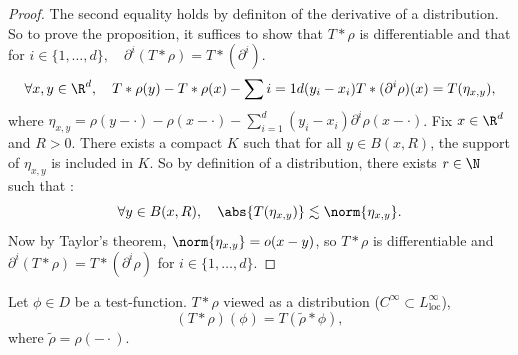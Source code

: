\begin{proof}
    The second equality holds by definiton of the derivative of a distribution. So to prove the proposition, 
    it suffices to show that $T*\rho$ is differentiable and that for $i \in \{1,\dots,d\}, \quad \partial^{i}(T*\rho) = T*(\partial^{i}).$
    \begin{equation*}
        \forall x,y \in \R^d, \quad T*\rho(y) - T*\rho(x) - \sum{i=1}{d} (y_i - x_i) T*(\partial^{i}\rho)(x) = T(\eta_{x,y}),
    \end{equation*}
    where $\eta_{x,y} = \rho(y - \cdot) - \rho(x- \cdot) - \sum_{i=1}^{d}(y_i - x_i)\partial^{i}\rho(x- \cdot)$.
    Fix $x\in \R^d$ and $R>0$. There exists a compact $K$ such that for all $y\in B(x,R)$, the support of $\eta_{x,y}$ is included in $K$.
    So by definition of a distribution, there exists $r\in \N$ such that :
    $$\forall y \in B(x,R), \quad \abs{T(\eta_{x,y})}\lesssim \norm{\eta_{x,y}}.$$
    Now by Taylor's theorem, $\norm{\eta_{x,y}} = o(x-y)$, so $T*\rho$ is differentiable and $\partial^{i}(T*\rho) = T*(\partial^{i}\rho)$ for $i\in \{1,\dots,d\}.$
\end{proof}

\begin{lemma}
    Let $\phi \in D$ be a test-function. $T*\rho$ viewed as a distribution ($C^\infty \subset L^\infty_{\text{loc}}$),
    $$(T*\rho) (\phi) = T(\tilde{\rho}*\phi),$$
    where $\tilde{\rho} = \rho(-\cdot)$.
\end{lemma}

